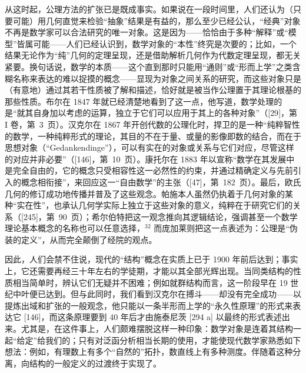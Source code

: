 从这时起，公理方法的扩张已是既成事实。如果说在一段时间里，人们还认为（只要可能）用几何直觉来检验“抽象”结果是有益的，那么至少已经公认，“经典”对象不再是数学家可以合法研究的唯一对象。这是因为——恰恰由于多种“解释”或“模型”皆属可能——人们已经认识到，数学对象的“本性”终究是次要的；比如，一个结果无论作为“纯”几何的定理呈现，还是借助解析几何作为代数定理呈现，都无关紧要。换句话说，数学的本质——这个直到那时只能用“通则”或“形而上学”之类含糊名称来表达的难以捉摸的概念——显现为对象之间关系的研究，而这些对象只是（有意地）通过其若干性质被了解和描述，恰好就是被当作公理置于其理论根基的那些性质。布尔在 1847 年就已经清楚地看到了这一点，他写道，数学处理的是“就其自身加以考虑的运算，独立于它们可以应用于其上的各种对象”（{[}29{]}，第 I 卷，第~3~页）。汉克尔在 1867 年开创代数的公理化时，捍卫的是一种“纯粹智性的数学，一种纯粹形式的理论，其目的不在于量、或量的影像即数的结合，而在于思想对象（“Gedankendinge”），可以有实在的对象或关系与它们对应，尽管这样的对应并非必要”（{[}146{]}，第~10~页）。康托尔在 1883 年以宣称“数学在其发展中是完全自由的，它的概念只受相容性这一必然性的约束，并通过精确定义与先前引入的概念相衔接”，来回应这一“自由数学”的主张（{[}47{]}，第~182~页）。最后，欧氏几何的修订成功地传播并普及了这些观念。帕施本人虽然仍执着于几何对象的某种“实在性”，也承认几何学实际上独立于这些对象的意义，纯粹在于研究它们的关系（{[}245{]}，第~90~页）；希尔伯特把这一观念推向其逻辑结论，强调甚至一个数学理论基本概念的名称也可以任意选择，\(^{32}\) 而庞加莱则把这一点表述为：公理是“伪装的定义”，从而完全颠倒了经院的观点。

因此，人们会禁不住说，现代的“结构”概念在实质上已于 1900 年前后达到；事实上，它还需要再经三十年左右的学徒期，才能以其全部光辉出现。当同类结构的性质相当简单时，辨认它们无疑并不困难；例如就群结构而言，这一阶段早在 19 世纪中叶便已达到。但与此同时，我们看到汉克尔在搏斗——却没有完全成功——以提炼出域和扩张的一般观念，他只能以一条半形而上学的“永久性原理”的形式来表达它 {[}146{]}，而这条原理要到 40 年后才由施泰尼茨 {[}294 a{]} 以最终的形式表述出来。尤其是，在这件事上，人们颇难摆脱这样一种印象：数学对象是连着其结构一起“给定”给我们的；只有对泛函分析相当长期的使用，才能使现代数学家熟悉如下想法：例如，有理数上有多个“自然的”拓扑，数直线上有多种测度。伴随着这种分离，向结构的一般定义的过渡终于实现了。

